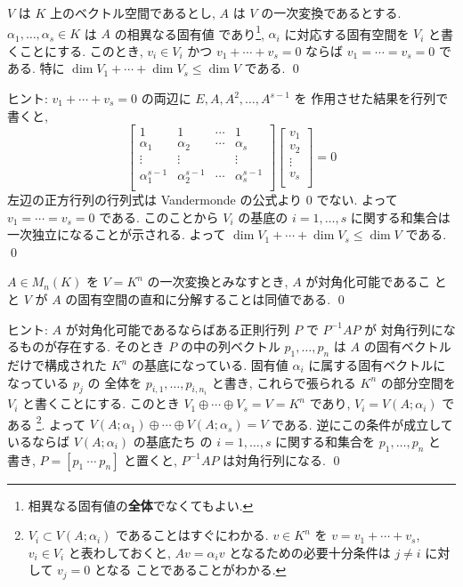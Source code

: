 \documentclass[12pt,twoside]{jarticle}
\begin{document}
\begin{question}
\label{q:eigenspace-decomp-pre}
  $V$ は $K$ 上のベクトル空間であるとし, $A$ は $V$ の一次変換であるとする.
  $\alpha_1,\dots,\alpha_s\in K$ は $A$ の相異なる固有値
  であり\footnote{相異なる固有値の{\bf 全体}でなくてもよい.}, %
  $\alpha_i$ に対応する固有空間を $V_i$ と書くことにする. 
  このとき, $v_i\in V_i$ かつ $v_1+\cdots+v_s = 0$ 
  ならば $v_1=\cdots=v_s=0$ である. 
  特に $\dim V_1+\cdots+\dim V_s \le \dim V$ である.
  \qed
\end{question}

\noindent
ヒント: $v_1+\cdots+v_s=0$ の両辺に $E,A,A^2,\dots,A^{s-1}$ を
作用させた結果を行列で書くと, 
\begin{equation*}
  \begin{bmatrix}
    1              & 1              & \cdots & 1 \\
    \alpha_1       & \alpha_2       & \cdots & \alpha_s \\
    \vdots         & \vdots         &        & \vdots \\
    \alpha_1^{s-1} & \alpha_2^{s-1} & \cdots & \alpha_s^{s-1} \\
  \end{bmatrix}
  \begin{bmatrix}
    v_1 \\ v_2 \\ \vdots \\ v_s \\
  \end{bmatrix}
  = 0
\end{equation*}
左辺の正方行列の行列式は Vandermonde の公式より $0$ でない.
よって $v_1=\cdots=v_s=0$ である.
このことから $V_i$ の基底の $i=1,\dots,s$ に関する和集合は
一次独立になることが示される. 
よって $\dim V_1+\cdots+\dim V_s \le \dim V$ である.
\qed


\begin{question}
\label{q:eigenspace-decomp}
  $A\in M_n(K)$ を $V=K^n$ の一次変換とみなすとき, $A$ が対角化可能であるこ
  とと $V$ が $A$ の固有空間の直和に分解することは同値である.
  \qed
\end{question}

\noindent
ヒント: $A$ が対角化可能であるならばある正則行列 $P$ で $P^{-1}AP$ が
対角行列になるものが存在する.  そのとき $P$ の中の列ベクトル $p_1,\dots,p_n$ 
は $A$ の固有ベクトルだけで構成された $K^n$ の基底になっている.
固有値 $\alpha_i$ に属する固有ベクトルになっている $p_j$ の
全体を $p_{i,1},\dots,p_{i,n_i}$ と書き, 
これらで張られる $K^n$ の部分空間を $V_i$ と書くことにする.
このとき $V_1\oplus\cdots\oplus V_s=V=K^n$ であり, $V_i=V(A;\alpha_i)$ である%
\footnote{$V_i\subset V(A;\alpha_i)$ であることはすぐにわかる.
  $v\in K^n$ を $v=v_1+\cdots+v_s$, $v_i\in V_i$ と表わしておくと,
  $Av=\alpha_iv$ となるための必要十分条件は $j\ne i$ に対して $v_j=0$ となる
  ことであることがわかる.}.
よって $V(A;\alpha_1)\oplus\cdots\oplus V(A;\alpha_s)=V$ である.
逆にこの条件が成立しているならば $V(A;\alpha_i)$ の基底たち
の $i=1,\dots,s$ に関する和集合を $p_1,\dots,p_n$ と
書き, $P=[p_1\ \cdots\ p_n]$ と置くと, $P^{-1}AP$ は対角行列になる.
\qed
\end{document}
